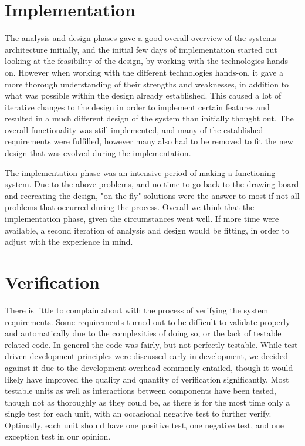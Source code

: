 \section{Implementation}

The analysis and design phases gave a good overall overview of the systems architecture initially, and the initial few days of implementation started out looking at the feasibility of the design, by working with the technologies hands on. However when working with the different technologies hands-on, it gave a more thorough understanding of their strengths and weaknesses, in addition to what was possible within the design already established. This caused a lot of iterative changes to the design in order to implement certain features and resulted in a much different design of the system than initially thought out. The overall functionality was still implemented, and many of the established requirements were fulfilled, however many also had to be removed to fit the new design that was evolved during the implementation.

The implementation phase was an intensive period of making a functioning system. Due to the above problems, and no time to go back to the drawing board and recreating the design, "on the fly" solutions were the answer to most if not all problems that occurred during the process. Overall we think that the implementation phase, given the circumstances went well. If more time were available, a second iteration of analysis and design would be fitting, in order to adjust with the experience in mind. 

\section{Verification}

There is little to complain about with the process of verifying the system requirements. Some requirements turned out to be difficult to validate properly and automatically due to the complexities of doing so, or the lack of testable related code. In general the code was fairly, but not perfectly testable. While test-driven development principles were discussed early in development, we decided against it due to the development overhead commonly entailed, though it would likely have improved the quality and quantity of verification significantly. Most testable units as well as interactions between components have been tested, though not as thoroughly as they could be, as there is for the most time only a single test for each unit, with an occasional negative test to further verify. Optimally, each unit should have one positive test, one negative test, and one exception test in our opinion.


